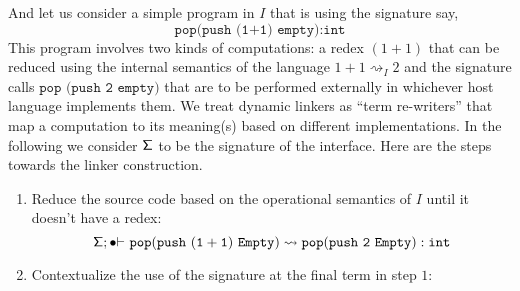         
        And let us consider a simple program in $I$ that is using the signature say, 
        $${\texttt{pop(push (1+1) empty):int}}$$
        This program involves two kinds of computations: a redex $(1+1)$ that can be reduced using the internal semantics of the language $1+1\rightsquigarrow_{I} 2$ and  
        the signature calls ${{\texttt{pop (push 2 empty)}}}$ 
        that are to be performed
        externally  in whichever host language implements them. 
        We treat  dynamic linkers as ``term re-writers'' that map  a computation to its meaning(s) based on different implementations.
        In the following we consider ${\sf \Sigma}$ to be the signature of the interface. Here are the steps towards the linker construction.
        
        \begin{enumerate}
            \item Reduce the source code based on the operational semantics of $I$ until it doesn't have a redex:
            \small{$$ {\sf \Sigma}; \bullet\mathtt{\vdash_{} pop (push \ (1+1) \ Empty)\rightsquigarrow pop (push \ 2 \ Empty) :int}$$}
            \item Contextualize the use of the signature at the final term in step $1$:
            

\end{enumerate}
